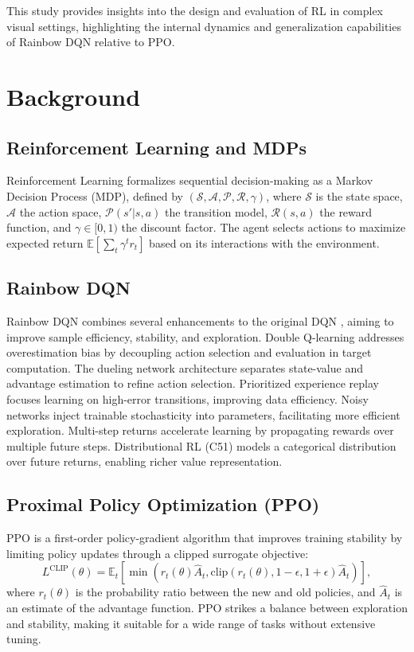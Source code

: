 \documentclass{article}
\begin{document}
This study provides insights into the design and evaluation of RL in complex visual settings, highlighting the internal dynamics and generalization capabilities of Rainbow DQN relative to PPO.

\section{Background}

\subsection{Reinforcement Learning and MDPs}

Reinforcement Learning formalizes sequential decision-making as a Markov Decision Process (MDP), defined by $(\mathcal{S}, \mathcal{A}, \mathcal{P}, \mathcal{R}, \gamma)$, where $\mathcal{S}$ is the state space, $\mathcal{A}$ the action space, $\mathcal{P}(s'|s,a)$ the transition model, $\mathcal{R}(s,a)$ the reward function, and $\gamma \in [0,1)$ the discount factor. The agent selects actions to maximize expected return $\mathbb{E}[\sum_t \gamma^t r_t]$ based on its interactions with the environment.

\subsection{Rainbow DQN}

Rainbow DQN \cite{hessel2018rainbow} combines several enhancements to the original DQN \cite{mnih2015human}, aiming to improve sample efficiency, stability, and exploration. Double Q-learning addresses overestimation bias by decoupling action selection and evaluation in target computation. The dueling network architecture separates state-value and advantage estimation to refine action selection. Prioritized experience replay focuses learning on high-error transitions, improving data efficiency. Noisy networks inject trainable stochasticity into parameters, facilitating more efficient exploration. Multi-step returns accelerate learning by propagating rewards over multiple future steps. Distributional RL (C51) models a categorical distribution over future returns, enabling richer value representation.

\subsection{Proximal Policy Optimization (PPO)}

PPO \cite{schulman2017proximal} is a first-order policy-gradient algorithm that improves training stability by limiting policy updates through a clipped surrogate objective:
\[
L^{\text{CLIP}}(\theta) = \mathbb{E}_t \left[ \min \left( r_t(\theta) \hat{A}_t, \text{clip}(r_t(\theta), 1 - \epsilon, 1 + \epsilon) \hat{A}_t \right) \right],
\]
where $r_t(\theta)$ is the probability ratio between the new and old policies, and $\hat{A}_t$ is an estimate of the advantage function. PPO strikes a balance between exploration and stability, making it suitable for a wide range of tasks without extensive tuning.
\end{document}
